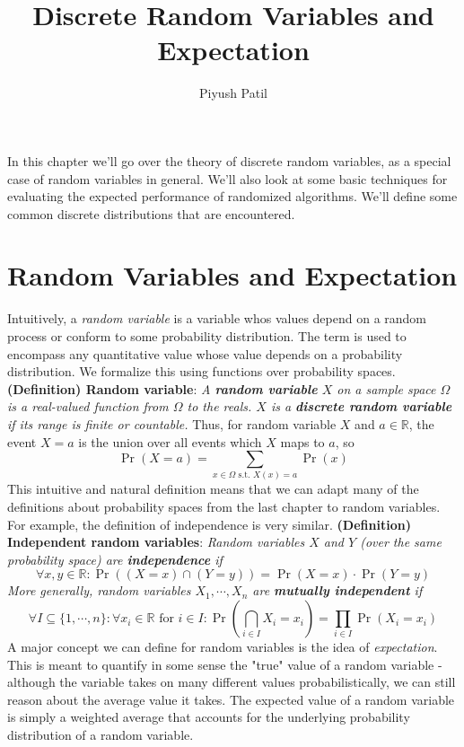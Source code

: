 \documentclass{article}
\newcommand*{\tb}{\textbf}
\newcommand*{\ti}{\textit}
\newcommand*{\nn}{\newline \newline}
\newcommand*{\st}{\text{ s.t. }}
\newcommand*{\R}{\mathbb{R}}
\begin{document}
\title{Discrete Random Variables and Expectation}
\author{Piyush Patil}
\maketitle

In this chapter we'll go over the theory of discrete random variables, as a special case of random variables in general. We'll also look at some basic techniques for evaluating the expected performance of randomized algorithms. We'll define some common discrete distributions that are encountered.

\section{Random Variables and Expectation}
Intuitively, a \ti{random variable} is a variable whos values depend on a random process or conform to some probability distribution. The term is used to encompass any quantitative value whose value depends on a probability distribution. We formalize this using functions over probability spaces.
\nn
\tb{(Definition) Random variable}: \ti{A \tb{random variable} $ X $ on a sample space $ \Omega $ is a real-valued function from $ \Omega $ to the reals. $ X $ is a \tb{discrete random variable} if its range is finite or countable.}
\nn
Thus, for random variable $ X $ and $ a \in \R $, the event $ X = a $ is the union over all events which $ X $ maps to $ a $, so
$$ \Pr(X = a) = \sum_{x \in \Omega \st X(x) = a} \Pr(x) $$
This intuitive and natural definition means that we can adapt many of the definitions about probability spaces from the last chapter to random variables. For example, the definition of independence is very similar.
\nn
\tb{(Definition) Independent random variables}: \ti{Random variables $ X $ and $ Y $ (over the same probability space) are \tb{independence} if}
$$ \forall x, y \in \R: \Pr((X = x) \cap (Y = y)) = \Pr(X = x) \cdot \Pr(Y = y) $$
\indent \ti{More generally, random variables $ X_1, \cdots, X_n $ are \tb{mutually independent} if}
$$ \forall I \subseteq \{ 1, \cdots, n \}: \forall x_i \in \R \text{ for } i \in I: \Pr \left( \bigcap_{i \in I} X_i = x_i \right) = \prod_{i \in I} \Pr(X_i = x_i) $$
A major concept we can define for random variables is the idea of \ti{expectation}. This is meant to quantify in some sense the "true" value of a random variable - although the variable takes on many different values probabilistically, we can still reason about the average value it takes. The expected value of a random variable is simply a weighted average that accounts for the underlying probability distribution of a random variable.
\end{document}
